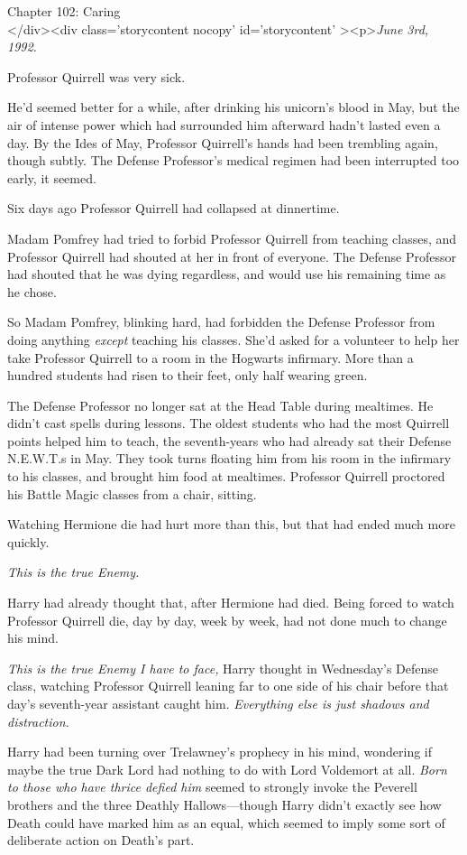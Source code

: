 
Chapter 102: Caring\\
</div><div  class='storycontent nocopy' id='storycontent' ><p>\emph{June 3rd, 
1992.}

Professor Quirrell was very sick.

He'd seemed better for a while, after drinking his unicorn's blood in May, but 
the air of intense power which had surrounded him afterward hadn't lasted even 
a day. By the Ides of May, Professor Quirrell's hands had been trembling again, 
though subtly. The Defense Professor's medical regimen had been interrupted too 
early, it seemed.

Six days ago Professor Quirrell had collapsed at dinnertime.

Madam Pomfrey had tried to forbid Professor Quirrell from teaching classes, and 
Professor Quirrell had shouted at her in front of everyone. The Defense 
Professor had shouted that he was dying regardless, and would use his remaining 
time as he chose.

So Madam Pomfrey, blinking hard, had forbidden the Defense Professor from doing 
anything \emph{except} teaching his classes. She'd asked for a volunteer to 
help her take Professor Quirrell to a room in the Hogwarts infirmary. More than 
a hundred students had risen to their feet, only half wearing green.

The Defense Professor no longer sat at the Head Table during mealtimes. He 
didn't cast spells during lessons. The oldest students who had the most 
Quirrell points helped him to teach, the seventh-years who had already sat 
their Defense N.E.W.T.s in May. They took turns floating him from his room in 
the infirmary to his classes, and brought him food at mealtimes. Professor 
Quirrell proctored his Battle Magic classes from a chair, sitting.

Watching Hermione die had hurt more than this, but that had ended much more 
quickly.

\emph{This is the true Enemy.}

Harry had already thought that, after Hermione had died. Being forced to watch 
Professor Quirrell die, day by day, week by week, had not done much to change 
his mind.

\emph{This is the true Enemy I have to face,} Harry thought in Wednesday's 
Defense class, watching Professor Quirrell leaning far to one side of his chair 
before that day's seventh-year assistant caught him.\emph{ Everything else is 
just shadows and distraction.}

Harry had been turning over Trelawney's prophecy in his mind, wondering if 
maybe the true Dark Lord had nothing to do with Lord Voldemort at all. 
\emph{Born to those who have thrice defied him} seemed to strongly invoke the 
Peverell brothers and the three Deathly Hallows---though Harry didn't exactly 
see how Death could have marked him as an equal, which seemed to imply some 
sort of deliberate action on Death's part.

